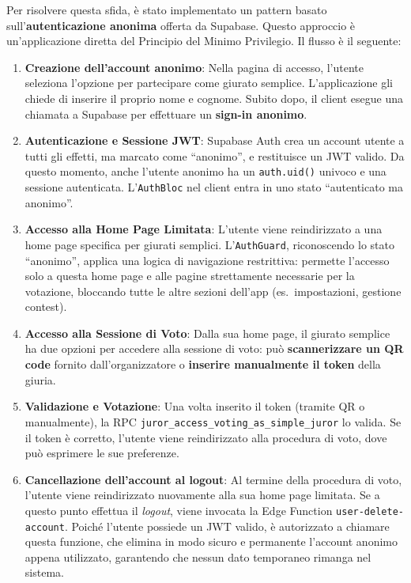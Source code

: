 Per risolvere questa sfida, è stato implementato un pattern basato sull'\textbf{autenticazione anonima} offerta da Supabase.
Questo approccio è un'applicazione diretta del Principio del Minimo Privilegio.
Il flusso è il seguente:

\begin{enumerate}
    \item \textbf{Creazione dell'account anonimo}: Nella pagina di accesso, l'utente seleziona l'opzione per partecipare come giurato semplice.
    L'applicazione gli chiede di inserire il proprio nome e cognome.
    Subito dopo, il client esegue una chiamata a Supabase per effettuare un \textbf{sign-in anonimo}.

    \item \textbf{Autenticazione e Sessione JWT}: Supabase Auth crea un account utente a tutti gli effetti, ma marcato come ``anonimo'', e restituisce un JWT valido.
    Da questo momento, anche l'utente anonimo ha un \texttt{auth.uid()} univoco e una sessione autenticata.
    L'\texttt{AuthBloc} nel client entra in uno stato ``autenticato ma anonimo''.

    \item \textbf{Accesso alla Home Page Limitata}: L'utente viene reindirizzato a una home page specifica per giurati semplici.
    L'\texttt{AuthGuard}, riconoscendo lo stato ``anonimo'', applica una logica di navigazione restrittiva: permette l'accesso solo a questa home page e alle pagine strettamente necessarie per la votazione, bloccando tutte le altre sezioni dell'app (es.\ impostazioni, gestione contest).

    \item \textbf{Accesso alla Sessione di Voto}: Dalla sua home page, il giurato semplice ha due opzioni per accedere alla sessione di voto: può \textbf{scannerizzare un QR code} fornito dall'organizzatore o \textbf{inserire manualmente il token} della giuria.

    \item \textbf{Validazione e Votazione}: Una volta inserito il token (tramite QR o manualmente), la RPC \texttt{juror\_access\_voting\_as\_simple\_juror} lo valida.
    Se il token è corretto, l'utente viene reindirizzato alla procedura di voto, dove può esprimere le sue preferenze.

    \item \textbf{Cancellazione dell'account al logout}: Al termine della procedura di voto, l'utente viene reindirizzato nuovamente alla sua home page limitata.
    Se a questo punto effettua il \emph{logout}, viene invocata la Edge Function \texttt{user-delete-account}.
    Poiché l'utente possiede un JWT valido, è autorizzato a chiamare questa funzione, che elimina in modo sicuro e permanente l'account anonimo appena utilizzato, garantendo che nessun dato temporaneo rimanga nel sistema.
\end{enumerate}

